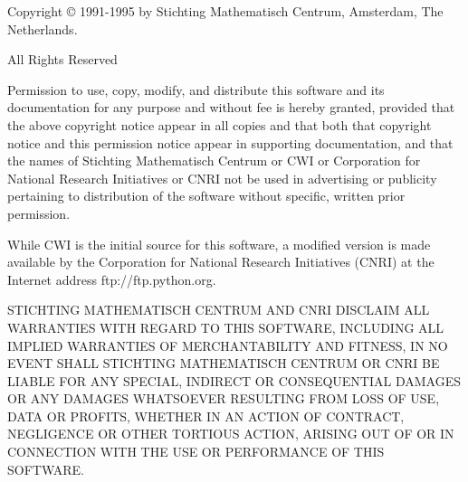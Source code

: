 Copyright \copyright{} 1991-1995 by Stichting Mathematisch Centrum,
Amsterdam, The Netherlands.

\begin{center}
All Rights Reserved
\end{center}

Permission to use, copy, modify, and distribute this software and its
documentation for any purpose and without fee is hereby granted,
provided that the above copyright notice appear in all copies and that
both that copyright notice and this permission notice appear in
supporting documentation, and that the names of Stichting Mathematisch
Centrum or CWI or Corporation for National Research Initiatives or
CNRI not be used in advertising or publicity pertaining to
distribution of the software without specific, written prior
permission.

While CWI is the initial source for this software, a modified version
is made available by the Corporation for National Research Initiatives
(CNRI) at the Internet address ftp://ftp.python.org.

STICHTING MATHEMATISCH CENTRUM AND CNRI DISCLAIM ALL WARRANTIES WITH
REGARD TO THIS SOFTWARE, INCLUDING ALL IMPLIED WARRANTIES OF
MERCHANTABILITY AND FITNESS, IN NO EVENT SHALL STICHTING MATHEMATISCH
CENTRUM OR CNRI BE LIABLE FOR ANY SPECIAL, INDIRECT OR CONSEQUENTIAL
DAMAGES OR ANY DAMAGES WHATSOEVER RESULTING FROM LOSS OF USE, DATA OR
PROFITS, WHETHER IN AN ACTION OF CONTRACT, NEGLIGENCE OR OTHER
TORTIOUS ACTION, ARISING OUT OF OR IN CONNECTION WITH THE USE OR
PERFORMANCE OF THIS SOFTWARE.

